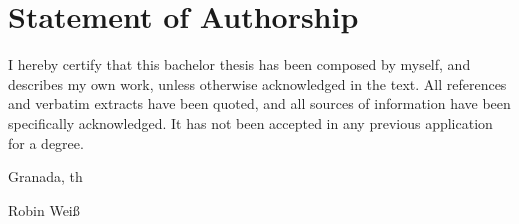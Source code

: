 \thispagestyle{empty}

\section*{Statement of Authorship}
I hereby certify that this bachelor thesis has been composed by myself, and describes my own work, unless otherwise acknowledged in the text. All references and verbatim extracts have been quoted, and all sources of information have been specifically acknowledged. It has not been accepted in any previous application for a degree.

\vspace{1cm}

\noindent 
Granada, \the\day th \monthname \: \the\year

\vspace{2cm}

\noindent
Robin Weiß
